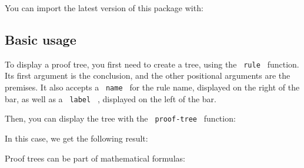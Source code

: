 You can import the latest version of this package with:

\begin{Shaded}
\begin{Highlighting}[]
\end{Highlighting}
\end{Shaded}

\subsection{Basic usage}\label{basic-usage}

To display a proof tree, you first need to create a tree, using the
\texttt{\ rule\ } function. Its first argument is the conclusion, and
the other positional arguments are the premises. It also accepts a
\texttt{\ name\ } for the rule name, displayed on the right of the bar,
as well as a \texttt{\ label\ } , displayed on the left of the bar.

\begin{Shaded}
\begin{Highlighting}[]
\NormalTok{  [Conclusion],}
\NormalTok{  [Premise 1],}
\NormalTok{  [Premise 2],}
\NormalTok{  [Premise 3]}
\NormalTok{)}
\end{Highlighting}
\end{Shaded}

Then, you can display the tree with the \texttt{\ proof-tree\ }
function:

\begin{Shaded}
\begin{Highlighting}[]
\end{Highlighting}
\end{Shaded}

In this case, we get the following result:

\pandocbounded{}

Proof trees can be part of mathematical formulas:

\begin{Shaded}
\begin{Highlighting}[]
\NormalTok{$}
\NormalTok{    )}
\NormalTok{  )}
\NormalTok{$}
\end{Highlighting}
\end{Shaded}

